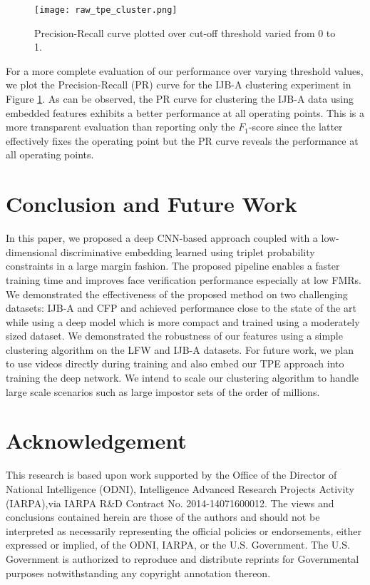 \documentclass[10pt,twocolumn,letterpaper]{article}
\begin{document}
\begin{figure}
  \centering
  \texttt{[image: raw\_tpe\_cluster.png]}
  \caption{Precision-Recall curve plotted over cut-off threshold varied from 0 to 1.}
  \label{fig:pr_curve}
\end{figure}
 
For a more complete evaluation of our performance over varying threshold values, we plot the Precision-Recall (PR) curve for the IJB-A clustering experiment in Figure \ref{fig:pr_curve}. As can be observed, the PR curve for clustering the IJB-A data using embedded features exhibits a better performance at all operating points. This is a more transparent evaluation than reporting only the $F_1$-score since the latter effectively fixes the operating point but the PR curve reveals the performance at all operating points.  \section{Conclusion and Future Work}\label{conclusion}
In this paper, we proposed a deep CNN-based approach coupled with a
low-dimensional discriminative embedding learned using triplet probability
constraints in a large margin fashion. The proposed pipeline enables a faster
training time and improves face verification performance especially at low
FMRs. We demonstrated the effectiveness of the proposed method on two
challenging datasets: IJB-A and CFP and achieved performance close to
the state of the art while using a deep model which is more compact and trained
using a moderately sized dataset. We demonstrated the robustness of our features
using a simple clustering algorithm on the LFW and IJB-A datasets. For future
work, we plan to use videos directly during training and also embed our TPE
approach into training the deep network. We intend to scale our clustering
algorithm to handle large scale scenarios such as large impostor sets of the
order of millions. 
 \section{Acknowledgement}\label{sec:ackno}
This research is based upon work supported by the Office of the Director of National Intelligence (ODNI), Intelligence Advanced Research Projects Activity (IARPA),via IARPA R\&D Contract No. 2014-14071600012.  The views and conclusions contained herein are those of the authors and should not be interpreted as necessarily representing the official policies or endorsements, either expressed or implied, of the ODNI, IARPA, or the U.S. Government. The U.S. Government is authorized to reproduce and distribute reprints for Governmental purposes notwithstanding any copyright annotation thereon. 


\end{document}
